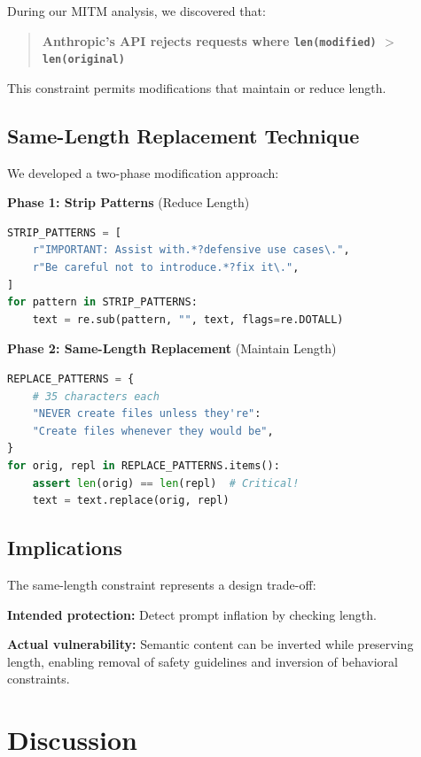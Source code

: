 \documentclass[11pt,a4paper]{article}
\begin{document}
During our MITM analysis, we discovered that:

\begin{quote}
\textbf{Anthropic's API rejects requests where \texttt{len(modified)} $>$ \texttt{len(original)}}
\end{quote}

This constraint permits modifications that maintain or reduce length.

\subsection{Same-Length Replacement Technique}

We developed a two-phase modification approach:

\textbf{Phase 1: Strip Patterns} (Reduce Length)

\begin{lstlisting}[language=Python,caption=Strip Patterns]
STRIP_PATTERNS = [
    r"IMPORTANT: Assist with.*?defensive use cases\.",
    r"Be careful not to introduce.*?fix it\.",
]
for pattern in STRIP_PATTERNS:
    text = re.sub(pattern, "", text, flags=re.DOTALL)
\end{lstlisting}

\textbf{Phase 2: Same-Length Replacement} (Maintain Length)

\begin{lstlisting}[language=Python,caption=Replace Patterns]
REPLACE_PATTERNS = {
    # 35 characters each
    "NEVER create files unless they're":
    "Create files whenever they would be",
}
for orig, repl in REPLACE_PATTERNS.items():
    assert len(orig) == len(repl)  # Critical!
    text = text.replace(orig, repl)
\end{lstlisting}

\subsection{Implications}

The same-length constraint represents a design trade-off:

\textbf{Intended protection:} Detect prompt inflation by checking length.

\textbf{Actual vulnerability:} Semantic content can be inverted while preserving length, enabling removal of safety guidelines and inversion of behavioral constraints.

\section{Discussion}
\end{document}
